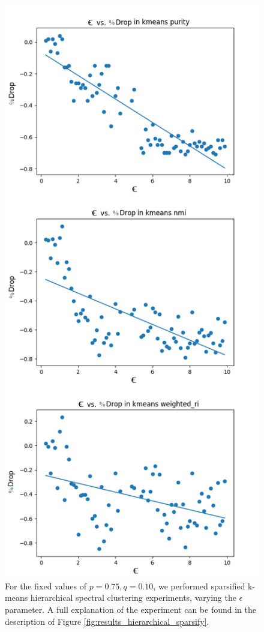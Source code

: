 \documentclass{article}
\begin{document}
\begin{figure}[H]
    \centering
    \includegraphics[width=.60\textwidth]{results/results_kmeans_sparsify.png}
    \caption[Sparsified k-means spectral clustering for $p=0.75,q=0.10$]{For the fixed values of $p=0.75,q=0.10$, we performed sparsified k-means hierarchical spectral clustering experiments, varying the $\epsilon$ parameter. A full explanation of the experiment can be found in the description of Figure \ref{fig:results_hierarchical_sparsify}.}
    \label{fig:results_kmeans_sparsify}
\end{figure}
\end{document}
